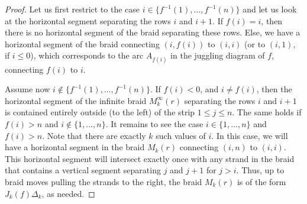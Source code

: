 \documentclass[10pt]{amsart}
\theoremstyle{plain}
\theoremstyle{definition}
\theoremstyle{remark}
\numberwithin{equation}{section}
\newcommand{\cB}{\mathcal{B}}
\begin{document}
\begin{proof} 
Let us first restrict to the case $i \in \{f^{-1}(1), \dots, f^{-1}(n)\}$ and let us look at the horizontal segment separating the rows $i$ and $i+1$. If $f(i) = i$, then there is no horizontal segment of the braid separating these rows. Else, we have a horizontal segment of the braid connecting $(i, f(i))$ to $(i,i)$ (or to $(i,1)$, if $i \leq 0$), which corresponds to the arc $A_{f(i)}$ in the juggling diagram of $f$, connecting $f(i)$ to $i$. 

Assume now $i \not\in \{f^{-1}(1), \dots, f^{-1}(n)\}$. If $f(i) < 0$, and $i \neq f(i)$, then the horizontal segment of the infinite braid $M_k^{\infty}(r)$ separating the rows $i$ and $i+1$ is contained entirely outside (to the left) of the strip $1 \leq j \leq n$. The same holds if $f(i) > n$ and $i \not\in \{1, \dots, n\}$. It remains to see the case $i \in \{1, \dots, n\}$ and $f(i) > n$. Note that there are exactly $k$ such values of $i$. In this case, we will have a horizontal segment in the braid $M_k(r)$ connecting $(i, n)$ to $(i,i)$. This horizontal segment will intersect exactly once with any strand in the braid that contains a vertical segment separating $j$ and $j+1$ for $j > i$. Thus, up to braid moves pulling the strands to the right, the braid $M_k(r)$ is of the form $J_k(f)\Delta_k$, as needed. 

\end{proof}

\end{document}
